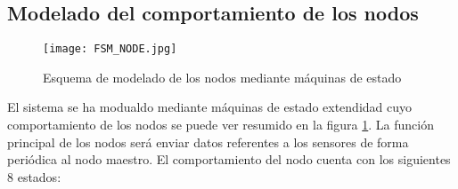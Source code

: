 				
	\subsection{Modelado del comportamiento de los nodos} \label{NodeFSM}
	
	\begin{figure}[!h]
		\centering
		\texttt{[image: FSM\_NODE.jpg]}
		\caption{Esquema de modelado de los nodos mediante máquinas de estado}
		\label{fig:nodeFSM}
	\end{figure}
	
	El sistema se ha modualdo mediante máquinas de estado extendidad cuyo comportamiento de los nodos se puede ver resumido en la figura \ref{fig:nodeFSM}. La función principal de los nodos será enviar datos referentes a los sensores de forma periódica al nodo maestro. 
	El comportamiento del nodo cuenta con los siguientes 8 estados:
	
